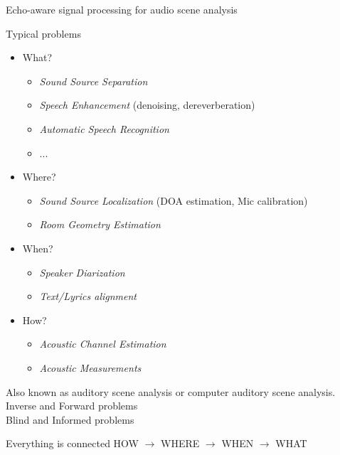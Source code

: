 \begin{frame}{Echo-aware signal processing for \alert{audio scene analysis}}

    \begin{block}{Typical problems}
        \vspace{-0.5em}
        \begin{itemize}
            \item What?
            \begin{itemize}
                \item \alert{\textit{Sound Source Separation}}
                \item \alert{\textit{Speech Enhancement}} (denoising, dereverberation)
                \item \textit{Automatic Speech Recognition}
                \item ...
            \end{itemize}
            \item Where?
            \begin{itemize}
                \item \alert{\textit{Sound Source Localization}} (DOA estimation, Mic calibration)
                \item \alert{\textit{Room Geometry Estimation}}
            \end{itemize}
            \item When?
            \begin{itemize}
                \item \textit{Speaker Diarization}
                \item \textit{Text/Lyrics alignment}
            \end{itemize}
            \item How?
            \begin{itemize}
                \item \textit{Acoustic Channel Estimation}
                \item \textit{Acoustic Measurements}
            \end{itemize}
        \end{itemize}
    \end{block}


    Also known as auditory scene analysis or computer auditory scene analysis.
    \\Inverse and Forward problems
    \\Blind and Informed problems

    \begin{block}{Everything is connected}
        HOW $\rightarrow$ WHERE $\rightarrow$ WHEN $\rightarrow$ WHAT
    \end{block}

\end{frame}


